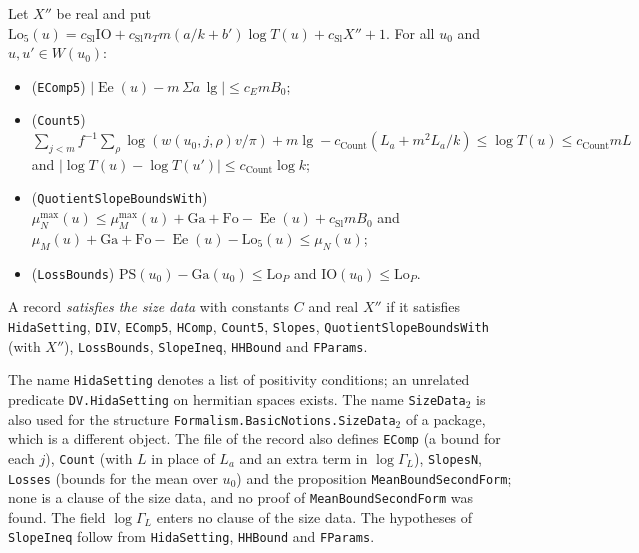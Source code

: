 \begin{definition}\label{geoa:clauses-5}
Let $X''$ be real and put
$\mathrm{Lo}_5(u)=c_{\mathrm{Sl}}\mathrm{IO}+c_{\mathrm{Sl}}n_Tm(a/k+b')\log T(u)
+c_{\mathrm{Sl}}X''+1$. For all $u_0$ and $u,u'\in W(u_0)$:
\begin{itemize}
\item (\texttt{EComp5}) $|\operatorname{Ee}(u)-m\,\Sigma a\,\lg|\le c_EmB_0$;
\item (\texttt{Count5}) $\sum_{j<m}f^{-1}\sum_{\rho}\log(w(u_0,j,\rho)v/\pi)+m\lg
-c_{\mathrm{Count}}(L_a+m^2L_a/k)\le\log T(u)\le c_{\mathrm{Count}}mL$ and
$|\log T(u)-\log T(u')|\le c_{\mathrm{Count}}\log k$;
\item (\texttt{QuotientSlopeBoundsWith}) $\mu_N^{\max}(u)\le\mu_M^{\max}(u)+\mathrm{Ga}
+\mathrm{Fo}-\operatorname{Ee}(u)+c_{\mathrm{Sl}}mB_0$ and
$\mu_M(u)+\mathrm{Ga}+\mathrm{Fo}-\operatorname{Ee}(u)-\mathrm{Lo}_5(u)\le\mu_N(u)$;
\item (\texttt{LossBounds}) $\mathrm{PS}(u_0)-\mathrm{Ga}(u_0)\le\mathrm{Lo}_P$ and
$\mathrm{IO}(u_0)\le\mathrm{Lo}_P$.
\end{itemize}
\end{definition}

\begin{definition}\label{geoa:sizedata}
A record \emph{satisfies the size data} with constants $C$ and real $X''$ if it satisfies
\texttt{HidaSetting}, \texttt{DIV}, \texttt{EComp5}, \texttt{HComp}, \texttt{Count5},
\texttt{Slopes}, \texttt{QuotientSlopeBoundsWith} (with $X''$), \texttt{LossBounds},
\texttt{SlopeIneq}, \texttt{HHBound} and \texttt{FParams}.
\end{definition}

\begin{remark}\label{geoa:rem-variants}
The name \texttt{HidaSetting} denotes a list of positivity conditions; an unrelated
predicate \texttt{DV.HidaSetting} on hermitian spaces exists. The name \texttt{SizeData}$_2$
is also used for the structure \texttt{Formalism.BasicNotions.SizeData}$_2$ of a package,
which is a different object. The file of the record also defines \texttt{EComp}
(a bound for each $j$), \texttt{Count} (with $L$ in place of $L_a$ and an extra term in
$\log\Gamma_L$), \texttt{SlopesN}, \texttt{Losses} (bounds for the mean over $u_0$) and
the proposition \texttt{MeanBoundSecondForm}; none is a clause of the size data, and no
proof of \texttt{MeanBoundSecondForm} was found. The field $\log\Gamma_L$ enters no clause
of the size data. The hypotheses of \texttt{SlopeIneq} follow from \texttt{HidaSetting},
\texttt{HHBound} and \texttt{FParams}.
\end{remark}

